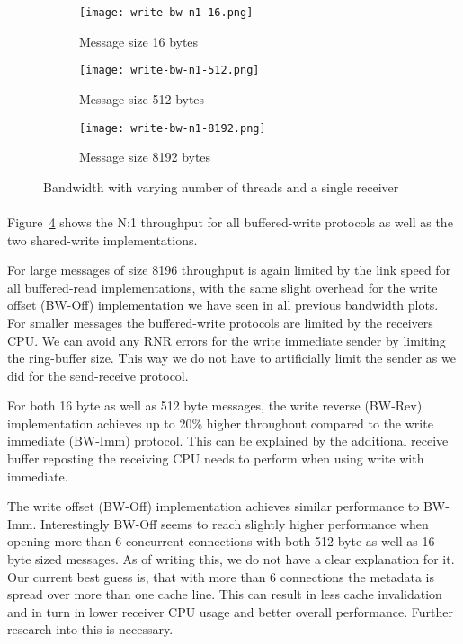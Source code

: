 \begin{figure}[ht]
  \centering
\begin{subfigure}[b]{0.49\textwidth}
  \centering
  \texttt{[image: write-bw-n1-16.png]}
  \caption{Message size 16 bytes}
  \label{fig:plot-write-bw-n1-16}
\end{subfigure}
\begin{subfigure}[b]{0.49\textwidth}
  \centering
  \texttt{[image: write-bw-n1-512.png]}
  \caption{Message size 512 bytes}
  \label{fig:plot-write-bw-n1-512}
\end{subfigure}
\begin{subfigure}[b]{0.49\textwidth}
  \centering
  \texttt{[image: write-bw-n1-8192.png]}
  \caption{Message size 8192 bytes}
  \label{fig:plot-write-bw-n1-8192}
\end{subfigure}
  \caption{Bandwidth with varying number of threads and a single receiver}
  \label{fig:plot-write-bw-n1}
\end{figure}

\paragraph{} Figure~\ref{fig:plot-write-bw-n1} shows the N:1 throughput for all buffered-write protocols as 
well as the two shared-write implementations.

For large messages of size 8196 throughput is again limited by the link speed for all buffered-read implementations, 
with the same slight overhead for the write offset (BW-Off) implementation we have seen in all previous bandwidth plots.
For smaller messages the buffered-write protocols are limited by the receivers CPU. We can avoid any 
RNR errors for the write immediate sender by limiting the ring-buffer size. This way we do not have to artificially limit 
the sender as we did for the send-receive protocol.

For both 16 byte as well as 512 byte messages, the write reverse \mbox{(BW-Rev)} implementation achieves up to 20\% higher throughout
compared to the write immediate (BW-Imm) protocol. This can be explained by the additional receive buffer reposting the 
receiving CPU needs to perform when using write with immediate. 

The write offset (BW-Off) implementation achieves similar performance to BW-Imm. Interestingly BW-Off seems to reach
slightly higher performance when opening more than 6 concurrent connections with both 512 byte as well as 16 byte
sized messages. As of
writing this, we do not have a clear explanation for it. Our current best guess is, that with more than 6 connections the 
metadata is spread over more than one cache line. This can result in less cache invalidation and in turn in lower receiver 
CPU usage and better overall performance. Further research into this is necessary. 


